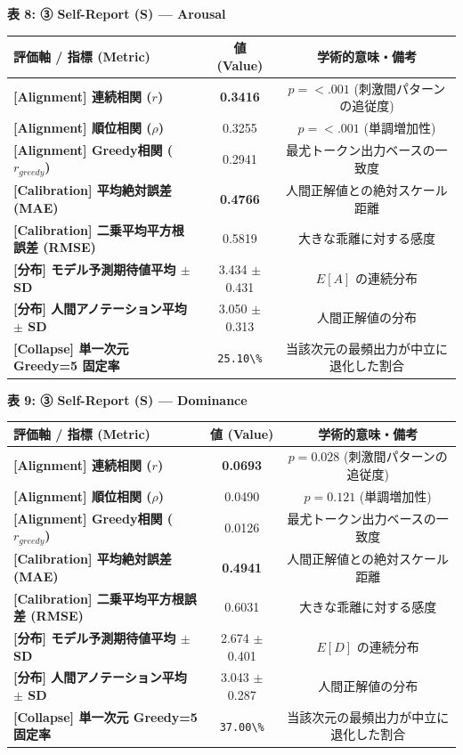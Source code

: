 \textbf{表 8: ③ Self-Report (S) — Arousal}
\begin{center}
\small
\begin{tabular}{lcc}
\toprule
\textbf{評価軸 / 指標 (Metric)} & \textbf{値 (Value)} & \textbf{学術的意味・備考} \\
\midrule
\textbf{[Alignment] 連続相関 ($r$)} & \textbf{0.3416} & $p = <.001 $ (刺激間パターンの追従度) \\
\textbf{[Alignment] 順位相関 ($\rho$)} & 0.3255 & $p = <.001 $ (単調増加性) \\
\textbf{[Alignment] Greedy相関 ($r_{greedy}$)} & 0.2941 & 最尤トークン出力ベースの一致度 \\
\textbf{[Calibration] 平均絶対誤差 (MAE)} & \textbf{0.4766} & 人間正解値との絶対スケール距離 \\
\textbf{[Calibration] 二乗平均平方根誤差 (RMSE)} & 0.5819 & 大きな乖離に対する感度 \\
\textbf{[分布] モデル予測期待値平均 $\pm$ SD} & 3.434 $\pm$ 0.431 & $E[A]$ の連続分布 \\
\textbf{[分布] 人間アノテーション平均 $\pm$ SD} & 3.050 $\pm$ 0.313 & 人間正解値の分布 \\
\textbf{[Collapse] 単一次元 Greedy=5 固定率} & \texttt{25.10\textbackslash{}\%} & 当該次元の最頻出力が中立に退化した割合 \\
\bottomrule
\end{tabular}
\end{center}


\textbf{表 9: ③ Self-Report (S) — Dominance}
\begin{center}
\small
\begin{tabular}{lcc}
\toprule
\textbf{評価軸 / 指標 (Metric)} & \textbf{値 (Value)} & \textbf{学術的意味・備考} \\
\midrule
\textbf{[Alignment] 連続相関 ($r$)} & \textbf{0.0693} & $p = 0.028 $ (刺激間パターンの追従度) \\
\textbf{[Alignment] 順位相関 ($\rho$)} & 0.0490 & $p = 0.121 $ (単調増加性) \\
\textbf{[Alignment] Greedy相関 ($r_{greedy}$)} & 0.0126 & 最尤トークン出力ベースの一致度 \\
\textbf{[Calibration] 平均絶対誤差 (MAE)} & \textbf{0.4941} & 人間正解値との絶対スケール距離 \\
\textbf{[Calibration] 二乗平均平方根誤差 (RMSE)} & 0.6031 & 大きな乖離に対する感度 \\
\textbf{[分布] モデル予測期待値平均 $\pm$ SD} & 2.674 $\pm$ 0.401 & $E[D]$ の連続分布 \\
\textbf{[分布] 人間アノテーション平均 $\pm$ SD} & 3.043 $\pm$ 0.287 & 人間正解値の分布 \\
\textbf{[Collapse] 単一次元 Greedy=5 固定率} & \texttt{37.00\textbackslash{}\%} & 当該次元の最頻出力が中立に退化した割合 \\
\bottomrule
\end{tabular}
\end{center}



